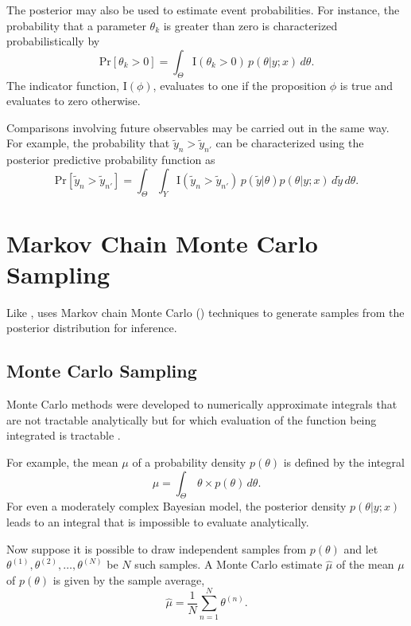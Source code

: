 The posterior may also be used to estimate event probabilities.  For
instance, the probability that a parameter $\theta_k$ is greater than
zero is characterized probabilistically by
%
\[
\mbox{Pr}[\theta_k > 0]
= \int_{\Theta} \mbox{I}(\theta_k > 0) \, p(\theta|y;x) \, d\theta.
\]
%
The indicator function, $\mbox{I}(\phi)$, evaluates to one if the
proposition $\phi$ is true and evaluates to zero otherwise.

Comparisons involving future observables may be carried out in
the same way.  For example, the probability that $\tilde{y}_n >
\tilde{y}_{n'}$ can be characterized using the posterior predictive
probability function as
\[
\mbox{Pr}[\tilde{y}_n > \tilde{y}_{n'}]
= \int_{\Theta} \int_{Y} \mbox{I}(\tilde{y}_n > \tilde{y}_{n'}) \,
p(\tilde{y}|\theta) p(\theta|y;x) \, d\tilde{y} \, d\theta.
\]




\chapter{Markov Chain Monte Carlo Sampling}

\noindent
Like \BUGS, \Stan uses Markov chain Monte Carlo (\MCMC) techniques to
generate samples from the posterior distribution for inference.  


\section{Monte Carlo Sampling}

Monte Carlo methods were developed to numerically approximate
integrals that are not tractable analytically but for which evaluation
of the function being integrated is tractable
\citep{MetropolisUlam:1949}.

For example, the mean $\mu$ of a probability density $p(\theta)$ is
defined by the integral
\[
\mu = \int_{\Theta} \, \theta \times p(\theta) \, d\theta.
\]
For even a moderately complex Bayesian model, the posterior density
$p(\theta|y;x)$ leads to an integral that is impossible to evaluate
analytically.

Now suppose it is possible to draw independent samples from
$p(\theta)$ and let $\theta^{(1)},\theta^{(2)},\ldots,\theta^{(N)}$ be
$N$ such samples.  A Monte Carlo estimate $\hat{\mu}$ of the mean
$\mu$ of $p(\theta)$ is given by the sample average,
\[
\hat{\mu} = \frac{1}{N} \sum_{n=1}^N \theta^{(n)}.
\]


